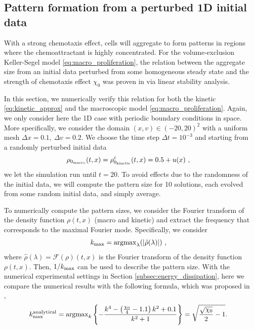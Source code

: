\documentclass{article}
\newcommand {\dx}   {\Delta x}
\begin{document}
{\subsection{Pattern formation from a perturbed 1D initial data}
With a strong chemotaxis effect, cells will aggregate to form patterns in regions where the chemoattractant is highly concentrated. 
For the volume-exclusion Keller-Segel model \eqref{eq:macro_proliferation}, the relation between the aggregate size from { an initial data perturbed from some homogeneous steady state} and the strength of chemotaxis effect $\chi_0$ {was proven in \cite{almeida2020treatment} via linear stability analysis. }
{

}
In this section, we numerically verify this relation for both the kinetic \eqref{eq:kinetic_approx} and the macroscopic model \eqref{eq:macro_proliferation}. 
{Again, we only consider here the 1D case with periodic boundary conditions in space. 
More specifically, we consider the domain $(x,v)\in (-20,20)^2$ with a uniform mesh {$\dx = 0.1,\  \Delta v =  0.2$}. We choose the time step $\Delta t = 10^{-3}$ and starting from a randomly perturbed initial data
\begin{equation*}
    \rho_{0_\textnormal{macro}}(t,x) = \rho_{0_\textnormal{kinetic}}^{\varepsilon}(t,x) = 0.5 + u(x)\ ,
\end{equation*}
we let the simulation run until $t=20$. 
To avoid effects due to the randomness of the initial data, we will compute the pattern size for 10 solutions, each evolved from some random initial data, and simply average. }

To numerically compute the pattern sizes, we consider the Fourier transform of the density function $\rho(t,x)$ (macro and kinetic) and extract the frequency that corresponds to the maximal Fourier mode. 
Specifically, we consider
\begin{equation*}
    k_{\rm max} = \rm{argmax}_{\lambda} (|\hat{\rho}(\lambda)|)\ , 
\end{equation*}
where $\hat{\rho}(\lambda) = \mathcal{F}(\rho)(t,x)$ is the Fourier transform of the density function $\rho(t,x)$. 
Then, $1/k_{\rm max}$ can be used to describe the pattern size. 
{ With the numerical experimental settings in Section \ref{subsec:energy_dissipation}, here we compare the numerical results with the following formula, which was proposed in \cite{almeida2020treatment}, 
\begin{equation*}
k_{\rm max}^{\rm analytical} = {\rm argmax}_{k} \left\{- \frac{k^4 - \left(\frac{\chi_0}{4}-1.1\right)k^2 +0.1}{k^2+1} \right\} = \sqrt{\frac{\sqrt{\chi_0}}{2} - 1}.
\end{equation*}
} 

}
\end{document}
